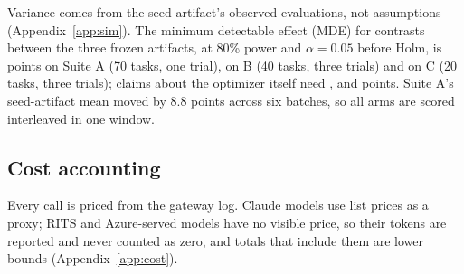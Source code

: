Variance comes from the seed artifact's observed evaluations, not assumptions (Appendix~\ref{app:sim}). The minimum detectable effect (MDE) for contrasts between the three frozen artifacts, at 80\% power and $\alpha=0.05$ before Holm, is \mdeACondOne{} points on Suite A (70 tasks, one trial), \mdeBCondThree{} on B (40 tasks, three trials) and \mdeCCondThree{} on C (20 tasks, three trials); claims about the optimizer itself need \mdeAPipeOne{}, \mdeBPipeThree{} and \mdeCPipeThree{} points. Suite A's seed-artifact mean moved by 8.8 points across six batches, so all arms are scored interleaved in one window. 

\subsection{Cost accounting}

Every call is priced from the gateway log. Claude models use list prices as a proxy; RITS and Azure-served models have no visible price, so their tokens are reported and never counted as zero, and totals that include them are lower bounds (Appendix~\ref{app:cost}).
